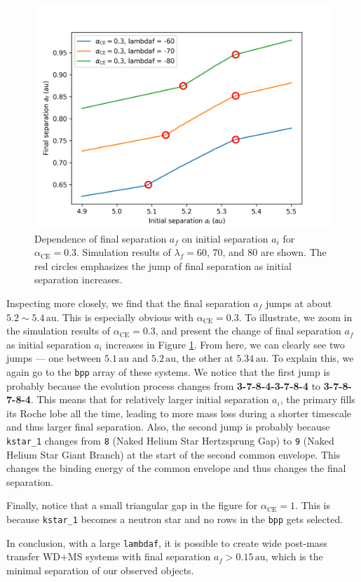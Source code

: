 \documentclass[12pt]{article}
\newcommand{\alphace}{\alpha_{\mathrm{CE}}}
\newcommand{\au}{\, \mathrm{au}}
\begin{document}
\begin{figure}
    \centering
    \includegraphics[width = 0.6\linewidth]{fig/jump-zoom.png}
    \caption{Dependence of final separation $a_f$ on initial separation $a_i$ for $\alphace = 0.3$. Simulation results of $\lambda_f = 60$, $70$, and $80$ are shown. The red circles emphasizes the jump of final separation as initial separation increases.}
    \label{jump-zoom}
\end{figure}

Inspecting more closely, we find that the final separation $a_f$ jumps at about $5.2 \sim 5.4 \au$. This is especially obvious with $\alphace = 0.3$. To illustrate, we zoom in the simulation results of $\alphace = 0.3$, and present the change of final separation $a_f$ as initial separation $a_i$ increases in Figure \ref{jump-zoom}. From here, we can clearly see two jumps — one between $5.1\au$ and $5.2\au$, the other at $5.34\au$. To explain this, we again go to the \verb|bpp| array of these systems. We notice that the first jump is probably because the evolution process changes from \textbf{3-7-8-4-3-7-8-4} to \textbf{3-7-8-7-8-4}. This means that for relatively larger initial separation $a_i$, the primary fills its Roche lobe all the time, leading to more mass loss during a shorter timescale and thus larger final separation. Also, the second jump is probably because \verb|kstar_1| changes from \verb|8| (Naked Helium Star Hertzsprung Gap) to \verb|9| (Naked Helium Star Giant Branch) at the start of the second common envelope. This changes the binding energy of the common envelope and thus changes the final separation.

Finally, notice that a small triangular gap in the figure for $\alphace = 1$. This is because \verb|kstar_1| becomes a neutron star and no rows in the \verb|bpp| gets selected.

In conclusion, with a large \verb|lambdaf|, it is possible to create wide post-mass transfer WD+MS systems with final separation $a_f > 0.15 \au$, which is the minimal separation of our observed objects.
\end{document}
